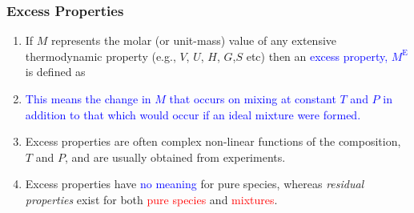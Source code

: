 \documentclass[10pt,compress,handout,ignorenonframetext]{beamer}
\newcommand{\red}{\textcolor{red}}
\newcommand{\blue}{\textcolor{blue}}
\begin{document}
\begin{frame}
  \frametitle{Excess Properties}
  \begin{enumerate}%
      \item<1-> If $M$ represents the molar (or unit-mass) value of any extensive thermodynamic property (e.g., $V$, $U$, $H$, $G$,$S$ etc) then an \blue{excess property, $M^{\text{E}}$} is defined as
      \item<2-> \blue{This means the change in $M$ that occurs on mixing at constant $T$ and $P$ in addition to that which would occur if an ideal mixture were formed.}
      \item<3-> Excess properties are often complex non-linear functions of the composition, $T$ and $P$, and are usually obtained from experiments.
      \item<4-> Excess properties have \blue{no meaning} for pure species, whereas {\it residual properties} exist for both \red{pure species} and \red{mixtures}.
  \end{enumerate}
\end{frame}
\normalsize
\end{document}
